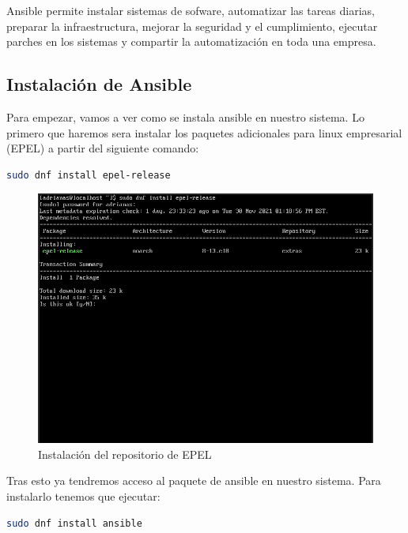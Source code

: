 Ansible permite instalar sistemas de sofware, automatizar las tareas diarias, preparar la infraestructura, mejorar la seguridad y el cumplimiento, ejecutar parches en los sistemas y compartir la automatización en toda una empresa.

\subsection{Instalación de Ansible}

Para empezar, vamos a ver como se instala ansible en nuestro sistema. Lo primero que haremos sera instalar los paquetes adicionales para linux empresarial (EPEL) a partir del siguiente comando:

\begin{lstlisting}[language=bash]
	sudo dnf install epel-release
\end{lstlisting}

\begin{figure}[H]
	\centering
	\includegraphics[scale=0.4]{graphics/img13}
	\caption{Instalación del repositorio de EPEL}
\end{figure}

\newpage
Tras esto ya tendremos acceso al paquete de ansible en nuestro sistema. Para instalarlo tenemos que ejecutar:

\begin{lstlisting}[language=bash]
	sudo dnf install ansible
\end{lstlisting}

